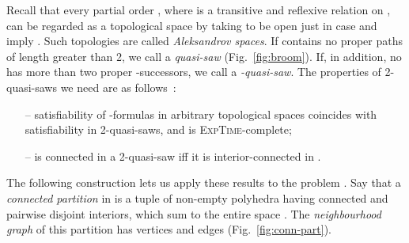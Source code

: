 \documentclass{article}
\newcommand{\ExpTime}{\textsc{ExpTime}}
\begin{document}
Recall that every partial order , where  is a transitive and
reflexive relation on , can be regarded as a topological space by
taking  to be open just in case  and 
imply . Such topologies are called \emph{Aleksandrov spaces}.
If  contains no proper paths of length greater than 2, we call
 a \emph{quasi-saw} (Fig.~\ref{fig:broom}).  If, in
addition, no  has more than two proper -successors, we
call  a \emph{-quasi-saw}.  The properties of 2-quasi-saws
we need are as follows~\cite{ijcai:kp-hwz10}:
\begin{itemize}\itemsep=0pt
\item[--] satisfiability of -formulas in arbitrary topological
  spaces coincides with satisfiability in 2-quasi-saws, and is
  \ExpTime-complete;

\item[--]  is connected in a 2-quasi-saw  iff it is interior-connected in .
\end{itemize}
The following construction lets us apply these results to the problem
.  Say that a \emph{connected partition} in
 is a tuple  of non-empty polyhedra having
connected and pairwise disjoint interiors, which sum to the entire
space . The \emph{neighbourhood graph}  of this partition
has vertices  and edges 
(Fig.~\ref{fig:conn-part}).
\end{document}
